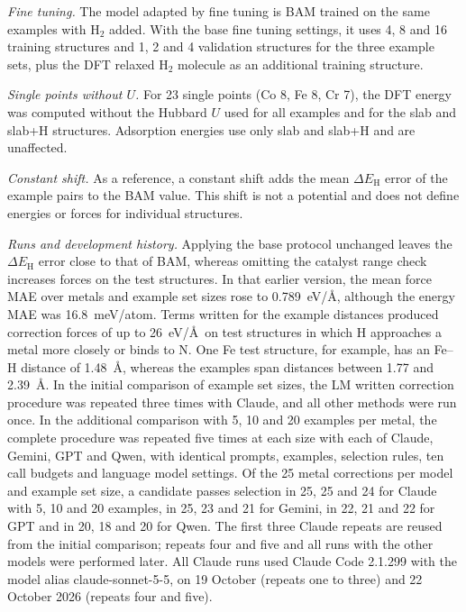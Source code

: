\textit{Fine tuning.} The model adapted by fine tuning is BAM trained on the same examples with H$_2$ added. With the base fine tuning settings, it uses 4, 8 and 16 training structures and 1, 2 and 4 validation structures for the three example sets, plus the DFT relaxed H$_2$ molecule as an additional training structure.

\textit{Single points without $U$.} For 23 single points (Co 8, Fe 8, Cr 7), the DFT energy was computed without the Hubbard $U$ used for all examples and for the slab and slab+H structures. Adsorption energies use only slab and slab+H and are unaffected.

\textit{Constant shift.} As a reference, a constant shift adds the mean $\Delta E_\mathrm{H}$ error of the example pairs to the BAM value. This shift is not a potential and does not define energies or forces for individual structures.

\textit{Runs and development history.} Applying the base protocol unchanged leaves the $\Delta E_\mathrm{H}$ error close to that of BAM, whereas omitting the catalyst range check increases forces on the test structures. In that earlier version, the mean force MAE over metals and example set sizes rose to 0.789~eV/\AA, although the energy MAE was 16.8~meV/atom. Terms written for the example distances produced correction forces of up to 26~eV/\AA\ on test structures in which H approaches a metal more closely or binds to N. One Fe test structure, for example, has an Fe--H distance of 1.48~\AA, whereas the examples span distances between 1.77 and 2.39~\AA. In the initial comparison of example set sizes, the LM written correction procedure was repeated three times with Claude, and all other methods were run once. In the additional comparison with 5, 10 and 20 examples per metal, the complete procedure was repeated five times at each size with each of Claude, Gemini, GPT and Qwen, with identical prompts, examples, selection rules, ten call budgets and language model settings. Of the 25 metal corrections per model and example set size, a candidate passes selection in 25, 25 and 24 for Claude with 5, 10 and 20 examples, in 25, 23 and 21 for Gemini, in 22, 21 and 22 for GPT and in 20, 18 and 20 for Qwen. The first three Claude repeats are reused from the initial comparison; repeats four and five and all runs with the other models were performed later. All Claude runs used Claude Code 2.1.299 with the model alias claude-sonnet-5-5, on 19 October (repeats one to three) and 22 October 2026 (repeats four and five).

